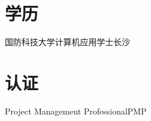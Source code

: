 \documentclass[11pt,a4paper]{moderncv}
\begin{document}
\section{学历}
\vspace*{0.2\baselineskip}
{国防科技大学}{计算机应用}{学士}{长沙}{}

\section{认证}
{Project Management Professional}{PMP}{}{}{}

\end{document}
